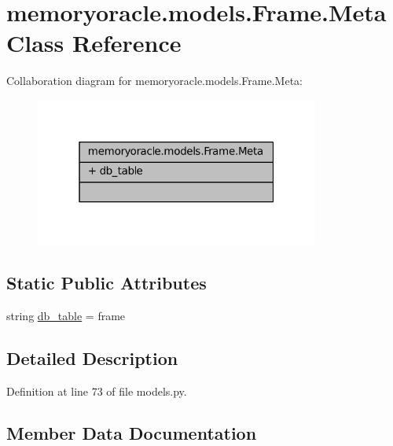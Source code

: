 \hypertarget{classmemoryoracle_1_1models_1_1Frame_1_1Meta}{}\section{memoryoracle.\+models.\+Frame.\+Meta Class Reference}
\label{classmemoryoracle_1_1models_1_1Frame_1_1Meta}


Collaboration diagram for memoryoracle.\+models.\+Frame.\+Meta\+:
\nopagebreak
\begin{figure}[H]
\begin{center}
\leavevmode
\includegraphics[width=265pt]{classmemoryoracle_1_1models_1_1Frame_1_1Meta__coll__graph}
\end{center}
\end{figure}
\subsection*{Static Public Attributes}
\begin{DoxyCompactItemize}
\item 
string \hyperlink{classmemoryoracle_1_1models_1_1Frame_1_1Meta_affeb34a34607a697f608778a2a94d558}{db\+\_\+table} = \textquotesingle{}frame\textquotesingle{}
\end{DoxyCompactItemize}


\subsection{Detailed Description}


Definition at line 73 of file models.\+py.



\subsection{Member Data Documentation}
\hypertarget{classmemoryoracle_1_1models_1_1Frame_1_1Meta_affeb34a34607a697f608778a2a94d558}{}
